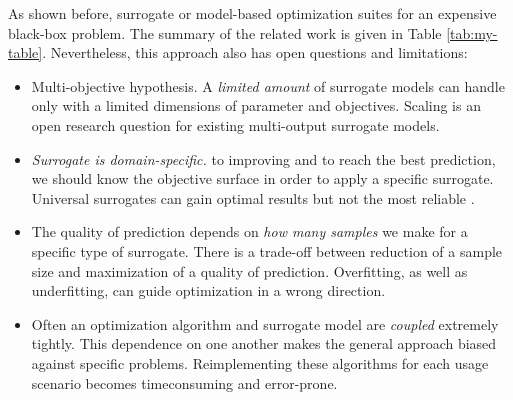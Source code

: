         As shown before, surrogate or model-based optimization suites for an expensive black-box problem. The summary of the related work is given in Table \ref{tab:my-table}. Nevertheless, this approach also has open questions and limitations:
        \begin{itemize}
            \item Multi-objective hypothesis. A \emph{limited amount} of surrogate models can handle 
            only with a limited dimensions of parameter and objectives. Scaling is an open research question for existing multi-output surrogate models.
            \item \emph{Surrogate is domain-specific.} to improving and to reach the best prediction, we should know the objective surface in order to apply a specific surrogate. Universal surrogates can gain optimal results but not the most reliable \cite{abs181207958, LuST19}.
            \item The quality of prediction depends on \emph{how many samples} we make for a specific type of surrogate. There is a trade-off between reduction of a sample size and maximization of a quality of prediction. Overfitting, as well as underfitting, can guide optimization in a wrong direction.
            \item Often an optimization algorithm and surrogate model are \emph{coupled} extremely tightly. This dependence on one another makes the general approach biased against specific problems. Reimplementing these algorithms for each usage scenario becomes timeconsuming and error-prone. 
        \end{itemize}

